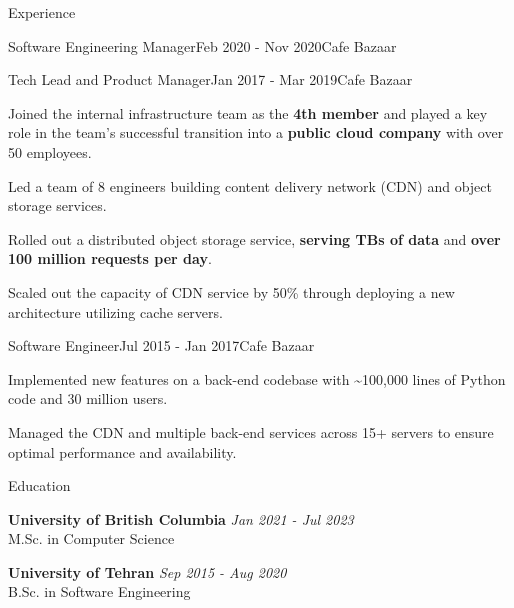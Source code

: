\documentclass[
	10pt, %
]{resume} %
\begin{document}
\begin{rSection}{Experience}
\begin{rSubsection}{Software Engineering Manager}{Feb 2020 - Nov 2020}{Cafe Bazaar}{}
  \end{rSubsection}

  \begin{rSubsection}{Tech Lead and Product Manager}{Jan 2017 - Mar 2019}{Cafe Bazaar}{}

    \item Joined the internal infrastructure team as the \textbf{4th member} and
      played a key role in the team's successful transition into a
      \textbf{public cloud company} with over 50 employees.

    \item Led a team of 8 engineers building content delivery network (CDN) and object storage services.

    \item Rolled out a distributed object storage service, \textbf{serving
      TBs of data} and \textbf{over 100 million requests per day}.

    \item Scaled out the capacity of CDN service by 50\% through deploying a new
      architecture utilizing cache servers.

  \end{rSubsection}

  \begin{rSubsection}{Software Engineer}{Jul 2015 - Jan 2017}{Cafe Bazaar}{}
    
    \item Implemented new features on a back-end codebase with \textasciitilde 100,000 lines
      of Python code and 30 million users.

    \item Managed the CDN and multiple back-end services across 15+ servers to
      ensure optimal performance and availability.

  \end{rSubsection}

\end{rSection}


\begin{rSection}{Education}
	
  \textbf{University of British Columbia} \hfill \textit{Jan 2021 - Jul 2023} \\ 
	M.Sc. in Computer Science

  \textbf{University of Tehran} \hfill \textit{Sep 2015 - Aug 2020} \\ 
	B.Sc. in Software Engineering
\end{rSection}
\end{document}
